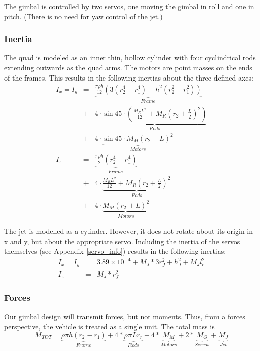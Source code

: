 \documentclass[11pt]{article}
\begin{document}
The gimbal is controlled by two servos, one moving the gimbal in roll and one in pitch. (There is no need for yaw control of the jet.)
\subsubsection{Inertia}
The quad is modeled as an inner thin, hollow cylinder with four cyclindrical rods extending outwards as the quad arms. The motors are point masses on the ends of the frames. This results in the following inertias about the three defined axes:
\begin{eqnarray}
    I_x = I_y & = & \underbrace{\frac{\pi \rho h}{12}(3(r_2^4-r_1^4) + h^2(r_2^2-r_1^2))}_{Frame} \nonumber \\ & + & 4 \cdot \underbrace{\sin 45 \cdot (\frac{M_R L^2}{12}+M_R(r_2+\frac{L}{2})^2)}_{Rods} \nonumber \\ & + & 4 \cdot \underbrace{\sin 45 \cdot M_M(r_2+L)^2}_{Motors} \\
    I_z & = & \underbrace{\frac{\pi \rho h}{2}(r_2^4-r_1^4)}_{Frame} \nonumber \\ & + & 4 \cdot \underbrace{\frac{M_RL^2}{12} + M_R(r_2+\frac{L}{2})^2}_{Rods} \nonumber \\ & + & 4 \cdot \underbrace{M_M(r_2+L)^2}_{Motors}
\end{eqnarray}

The jet is modelled as a cylinder. However, it does not rotate about its origin in x and y, but about the appropriate servo. Including the inertia of the servos themselves (see Appendix \ref{servo_info}) results in the following inertias:
\begin{eqnarray}
    I_x = I_y & = & 3.89\times10^{-4} + M_J*3r_J^2 + h_J^2 + M_Jl_c^2 \\
    I_z & = & M_J*r_J^2
\end{eqnarray}

\subsubsection{Forces}
Our gimbal design will transmit forces, but not moments. Thus, from a forces perspective, the vehicle is treated as a single unit. The total mass is
\begin{equation}
    M_{TOT} = \underbrace{\rho\pi h (r_2-r_1)}_{Frame} + 4*\underbrace{\rho\pi L r_r}_{Rods} + 4*\underbrace{M_M}_{Motors} + 2*\underbrace{M_G}_{Servos} + \underbrace{M_J}_{Jet}
\end{equation}
\end{document}
